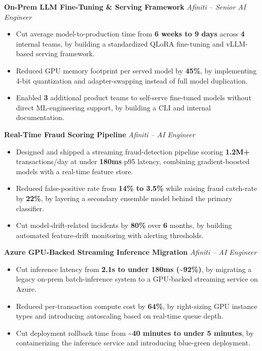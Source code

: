 \documentclass[10.5pt,letterpaper]{article}
\newcommand{\projheader}[3]{%
  \textbf{#1} \hfill \textit{#2 -- #3}%
}
\begin{document}
\vspace{5pt}
\projheader{On-Prem LLM Fine-Tuning \& Serving Framework}{Afiniti}{Senior AI Engineer}
\begin{itemize}
  \item Cut average model-to-production time from \textbf{6 weeks to 9 days} across \textbf{4} internal teams, by building a standardized QLoRA fine-tuning and vLLM-based serving framework.
  \item Reduced GPU memory footprint per served model by \textbf{45\%}, by implementing 4-bit quantization and adapter-swapping instead of full model duplication.
  \item Enabled \textbf{3} additional product teams to self-serve fine-tuned models without direct ML-engineering support, by building a CLI and internal documentation.
\end{itemize}

\vspace{5pt}
\projheader{Real-Time Fraud Scoring Pipeline}{Afiniti}{AI Engineer}
\begin{itemize}
  \item Designed and shipped a streaming fraud-detection pipeline scoring \textbf{1.2M+} transactions/day at under \textbf{180ms} p95 latency, combining gradient-boosted models with a real-time feature store.
  \item Reduced false-positive rate from \textbf{14\% to 3.5\%} while raising fraud catch-rate by \textbf{22\%}, by layering a secondary ensemble model behind the primary classifier.
  \item Cut model-drift-related incidents by \textbf{80\%} over \textbf{6} months, by building automated feature-drift monitoring with alerting thresholds.
\end{itemize}

\vspace{5pt}
\projheader{Azure GPU-Backed Streaming Inference Migration}{Afiniti}{AI Engineer}
\begin{itemize}
  \item Cut inference latency from \textbf{2.1s to under 180ms (\textasciitilde92\%)}, by migrating a legacy on-prem batch-inference system to a GPU-backed streaming service on Azure.
  \item Reduced per-transaction compute cost by \textbf{64\%}, by right-sizing GPU instance types and introducing autoscaling based on real-time queue depth.
  \item Cut deployment rollback time from \textbf{\textasciitilde40 minutes to under 5 minutes}, by containerizing the inference service and introducing blue-green deployment.
\end{itemize}
\end{document}
